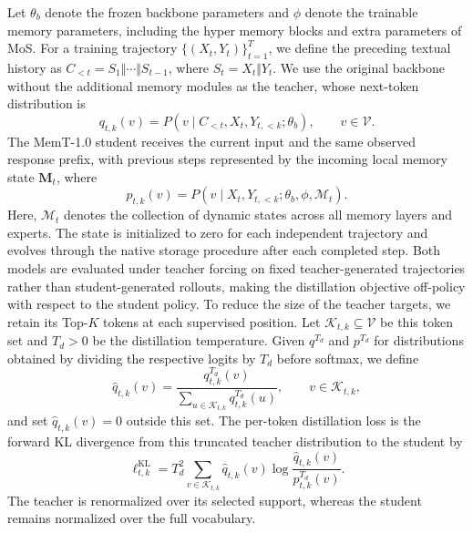 Let $\theta_{b}$ denote the frozen backbone parameters and $\phi$ denote the trainable memory parameters, including the hyper memory blocks and extra parameters of MoS.
For a training trajectory $\{(X_t,Y_t)\}_{t=1}^{T}$, we define the preceding textual history as $C_{<t}=S_1\Vert\cdots\Vert S_{t-1}$, where $S_t=X_t\Vert Y_t$.
We use the original backbone without the additional memory modules as the teacher, whose next-token distribution is
\begin{equation*}
    q_{t,k}(v)
    = P\left(v \mid C_{<t},X_t,Y_{t,<k};\theta_{b}\right),
    \qquad v\in\mathcal{V}.
\end{equation*}
The MemT-1.0 student receives the current input and the same observed response prefix, with previous steps represented by the incoming local memory state $\mathbf{M}_t$, where
\begin{equation*}
    p_{t,k}(v)
    = P\left(v \mid X_t,Y_{t,<k};\theta_{b},\phi,\bm{\mathcal{M}}_t\right).
\end{equation*}
Here, $\bm{\mathcal{M}}_t$ denotes the collection of dynamic states
across all memory layers and experts.
The state is initialized to zero for each independent trajectory
and evolves through the native storage procedure after each completed step.
Both models are evaluated under teacher forcing on
fixed teacher-generated trajectories rather than student-generated
rollouts, making the distillation objective off-policy
with respect to the student policy.
To reduce the size of the teacher targets, we retain its Top-$K$ tokens at each supervised position.
Let $\mathcal{K}_{t,k}\subseteq\mathcal{V}$ be this token set and $T_{d}>0$ be the distillation temperature.
Given $q^{T_{d}}$ and $p^{T_{d}}$ for distributions obtained by dividing the respective logits by $T_{d}$ before softmax, we define
\begin{equation*}
    \hat{q}_{t,k}(v)
    = \frac{q^{T_{d}}_{t,k}(v)}
    {\sum_{u\in\mathcal{K}_{t,k}}q^{T_{d}}_{t,k}(u)},
    \qquad v\in\mathcal{K}_{t,k},
\end{equation*}
and set $\hat{q}_{t,k}(v)=0$ outside this set.
The per-token distillation loss is the forward KL divergence from this truncated teacher distribution to the student by
\begin{equation*}
    \ell^{\mathrm{KL}}_{t,k}
    = T_{d}^{2}
    \sum_{v\in\mathcal{K}_{t,k}}
    \hat{q}_{t,k}(v)
    \log\frac{\hat{q}_{t,k}(v)}{p^{T_{d}}_{t,k}(v)}.
\end{equation*}
The teacher is renormalized over its selected support, whereas the student remains normalized over the full vocabulary.
